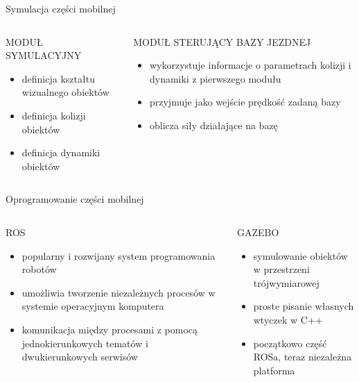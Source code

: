 \begin{frame}{Symulacja części mobilnej}
	\begin{columns}
		\begin{column}{0.5\textwidth}
			\begin{center}
				MODUŁ SYMULACYJNY
			\end{center}
			\begin{itemize}
				\item definicja kształtu wizualnego obiektów
				\item definicja kolizji obiektów
				\item definicja dynamiki obiektów
			\end{itemize}
			
		\end{column}
		\begin{column}{0.5\textwidth}  %
			\begin{center}
				MODUŁ STERUJĄCY BAZY JEZDNEJ
			\end{center}
			\begin{itemize}
				\item wykorzystuje informacje o parametrach kolizji i dynamiki z pierwszego modułu
				\item przyjmuje jako wejście prędkość zadaną bazy
				\item oblicza siły działające na bazę
			\end{itemize}
		\end{column}
	\end{columns}
\end{frame}

\begin{frame}{Oprogramowanie części mobilnej}
	\begin{columns}
		\begin{column}{0.5\textwidth}
			\begin{center}
				ROS
			\end{center}
			\begin{itemize}
				\item popularny i rozwijany system programowania robotów
				\item umożliwia tworzenie niezależnych procesów w systemie operacyjnym komputera
				\item komunikacja między procesami z pomocą jednokierunkowych tematów i dwukierunkowych serwisów
			\end{itemize}
			
		\end{column}
		\begin{column}{0.5\textwidth}  %
			\begin{center}
				GAZEBO
			\end{center}
			\begin{itemize}
				\item symulowanie obiektów w przestrzeni trójwymiarowej
				\item proste pisanie własnych wtyczek w C++
				\item początkowo część ROSa, teraz niezależna platforma
			\end{itemize}
		\end{column}
	\end{columns}
\end{frame}